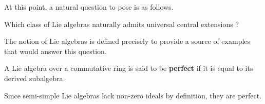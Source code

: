         At this point, a natural question to pose is as follows.
        \begin{question}
            Which class of Lie algebras naturally admits universal central extensions ? 
        \end{question}
        The notion of  Lie algebras is defined precisely to provide a source of examples that would answer this question. 
        \begin{definition}
            A Lie algebra over a commutative ring is said to be \textbf{perfect} if it is equal to its derived subalgebra. 
        \end{definition}
        \begin{example}
            Since semi-simple Lie algebras lack non-zero ideals by definition, they are perfect. 
        \end{example}
